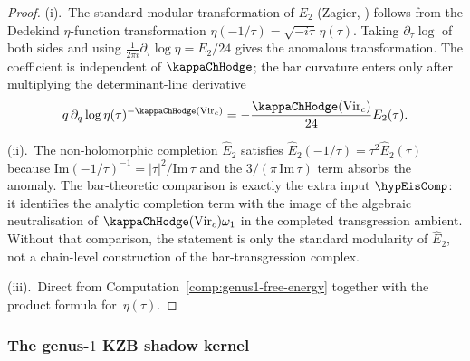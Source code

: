 \begin{proof}
(i).\ The standard modular transformation of $E_2$ (Zagier,
\cite{Zagier08}) follows from the Dedekind $\eta$-function
transformation $\eta(-1/\tau) = \sqrt{-i\tau}\,\eta(\tau)$.
Taking $\partial_\tau\log$ of both sides and using
$\frac{1}{2\pi i}\partial_\tau\log\eta = E_2/24$ gives the
anomalous transformation.  The coefficient is independent of
\(\kappaChHodge\); the bar curvature enters only after multiplying the
determinant-line derivative
\[
q\,\partial_q\log \eta(\tau)^{-\kappaChHodge(\mathrm{Vir}_c)}
=-\frac{\kappaChHodge(\mathrm{Vir}_c)}{24}E_2(\tau).
\]

(ii).\ The non-holomorphic completion $\widehat{E}_2$ satisfies
$\widehat{E}_2(-1/\tau) = \tau^2 \widehat{E}_2(\tau)$ because
$\mathrm{Im}(-1/\tau)^{-1} = |\tau|^2/\mathrm{Im}\,\tau$
and the $3/(\pi\,\mathrm{Im}\,\tau)$ term absorbs the anomaly.
The bar-theoretic comparison is exactly the extra input
\(\hypEisComp\): it identifies the analytic completion term with the
image of the algebraic neutralisation of
\(\kappaChHodge(\mathrm{Vir}_c)\omega_1\) in the completed
transgression ambient.  Without that comparison, the statement is only
the standard modularity of \(\widehat E_2\), not a chain-level
construction of the bar-transgression complex.

(iii).\ Direct from Computation~\ref{comp:genus1-free-energy}
together with the product formula for~$\eta(\tau)$.
\end{proof}

\subsubsection*{The genus-$1$ KZB shadow kernel}

